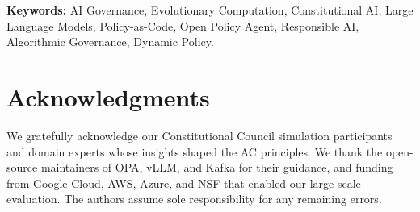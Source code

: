\textbf{Keywords:} AI Governance, Evolutionary Computation, Constitutional AI, Large Language Models, Policy-as-Code, Open Policy Agent, Responsible AI, Algorithmic Governance, Dynamic Policy.
















\section*{Acknowledgments}
We gratefully acknowledge our Constitutional Council simulation participants and domain experts whose insights shaped the AC principles. We thank the open-source maintainers of OPA, vLLM, and Kafka for their guidance, and funding from Google Cloud, AWS, Azure, and NSF that enabled our large-scale evaluation. The authors assume sole responsibility for any remaining errors.

{\small


}





